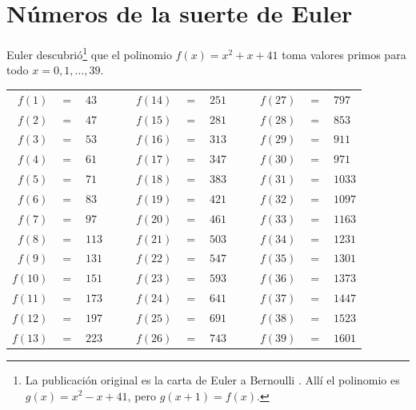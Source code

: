 
\section{Números de la suerte de Euler}

Euler descubrió\footnote{La publicación original es la carta de Euler a
  Bernoulli \cite{E461}. Allí el polinomio es $g (x) = x^2 - x + 41$,
  pero $g (x+1) = f (x)$.} que el polinomio $f (x) = x^2 + x + 41$ toma valores
primos para todo $x = 0, 1, \ldots, 39$.

\begin{center}\renewcommand{\arraystretch}{1.5}
  \begin{tabular}{rclc|crclc|crcl}
    $f (1)$  & $=$ & $43$  & & & $f (14)$ & $=$ & $251$ & & & $f (27)$ & $=$ & $797$ \\
    $f (2)$  & $=$ & $47$  & & & $f (15)$ & $=$ & $281$ & & & $f (28)$ & $=$ & $853$ \\
    $f (3)$  & $=$ & $53$  & & & $f (16)$ & $=$ & $313$ & & & $f (29)$ & $=$ & $911$ \\
    $f (4)$  & $=$ & $61$  & & & $f (17)$ & $=$ & $347$ & & & $f (30)$ & $=$ & $971$ \\
    $f (5)$  & $=$ & $71$  & & & $f (18)$ & $=$ & $383$ & & & $f (31)$ & $=$ & $1033$ \\
    $f (6)$  & $=$ & $83$  & & & $f (19)$ & $=$ & $421$ & & & $f (32)$ & $=$ & $1097$ \\
    $f (7)$  & $=$ & $97$  & & & $f (20)$ & $=$ & $461$ & & & $f (33)$ & $=$ & $1163$ \\
    $f (8)$  & $=$ & $113$ & & & $f (21)$ & $=$ & $503$ & & & $f (34)$ & $=$ & $1231$ \\
    $f (9)$  & $=$ & $131$ & & & $f (22)$ & $=$ & $547$ & & & $f (35)$ & $=$ & $1301$ \\
    $f (10)$ & $=$ & $151$ & & & $f (23)$ & $=$ & $593$ & & & $f (36)$ & $=$ & $1373$ \\
    $f (11)$ & $=$ & $173$ & & & $f (24)$ & $=$ & $641$ & & & $f (37)$ & $=$ & $1447$ \\
    $f (12)$ & $=$ & $197$ & & & $f (25)$ & $=$ & $691$ & & & $f (38)$ & $=$ & $1523$ \\
    $f (13)$ & $=$ & $223$ & & & $f (26)$ & $=$ & $743$ & & & $f (39)$ & $=$ & $1601$ \\
  \end{tabular}
\end{center}

